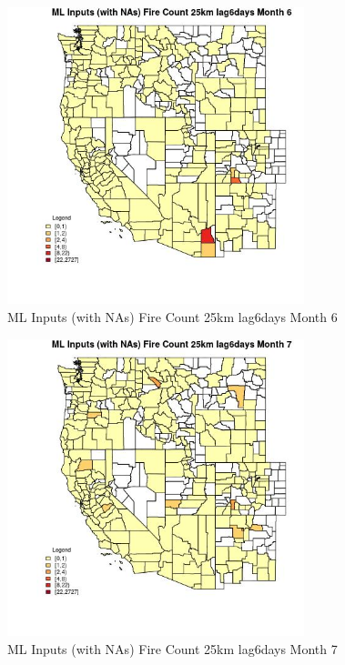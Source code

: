 \begin{figure} 
\centering  
\includegraphics[width=0.77\textwidth]{Code_Outputs/Report_ML_input_PM25_Step4_part_f_de_duplicated_aves_prioritize_24hr_obswNAs_CountyFire_Count_25km_lag6daysmedianMonth6.jpg} 
\caption{\label{fig:Report_ML_input_PM25_Step4_part_f_de_duplicated_aves_prioritize_24hr_obswNAsCountyFire_Count_25km_lag6daysmedianMonth6}ML Inputs (with NAs) Fire Count 25km lag6days Month 6} 
\end{figure} 
 

\begin{figure} 
\centering  
\includegraphics[width=0.77\textwidth]{Code_Outputs/Report_ML_input_PM25_Step4_part_f_de_duplicated_aves_prioritize_24hr_obswNAs_CountyFire_Count_25km_lag6daysmedianMonth7.jpg} 
\caption{\label{fig:Report_ML_input_PM25_Step4_part_f_de_duplicated_aves_prioritize_24hr_obswNAsCountyFire_Count_25km_lag6daysmedianMonth7}ML Inputs (with NAs) Fire Count 25km lag6days Month 7} 
\end{figure} 
 

